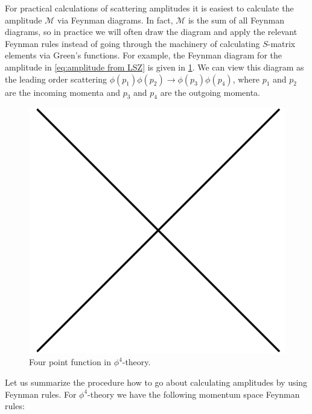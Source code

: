 For practical calculations of scattering amplitudes it is easiest to calculate the amplitude $\mathcal{M}$ via Feynman diagrams. In fact, $\mathcal{M}$ is the sum of all Feynman diagrams, so in practice we will often draw the diagram and apply the relevant Feynman rules instead of going through the machinery of calculating $S$-matrix elements via Green's functions. For example, the Feynman diagram for the amplitude in \cref{eq:amplitude from LSZ} is given in \cref{fig:fourpointfunction}. We can view this diagram as the leading order scattering $\phi(p_1)\phi(p_2)\rightarrow\phi(p_3)\phi(p_4)$, where $p_1$ and $p_2$ are the incoming momenta and $p_3$ and $p_4$ are the outgoing momenta.
\begin{figure}
    \centering
    \includegraphics[scale=0.3]{Figures/fourpointphi4.pdf}
    \caption{Four point function in $\phi^{4}$-theory.}
    \label{fig:fourpointfunction}
\end{figure}

Let us summarize the procedure how to go about calculating amplitudes by using Feynman rules. For $\phi^{4}$-theory we have the following momentum space Feynman rules:

